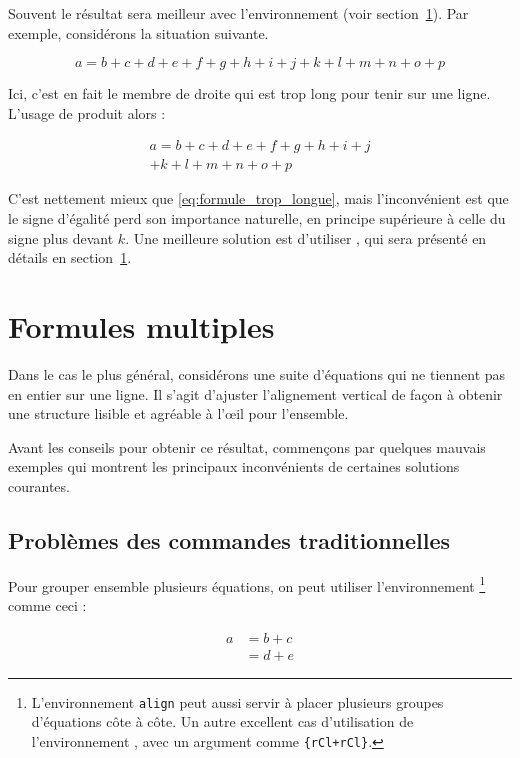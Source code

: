 Souvent le résultat sera
meilleur avec l'environnement  (voir
section~\ref{sec:IEEEeqnarray}). Par exemple, considérons la situation
suivante.
\begin{example}
\begin{equation}
  a = b + c + d + e + f 
  + g + h + i + j 
  + k + l + m + n + o + p  
  \label{eq:formule_trop_longue}
\end{equation}
\end{example}
\noindent
Ici, c'est en fait le membre de droite qui est trop long pour tenir sur une
ligne. L'usage de  produit alors :
\begin{example}
\begin{multline}
  a = b + c + d + e + f 
  + g + h + i + j \\
  + k + l + m + n + o + p
\end{multline}
\end{example}

C'est nettement mieux que \eqref{eq:formule_trop_longue}, mais
l'inconvénient est que le signe d'égalité perd son importance naturelle, en
principe supérieure à celle du signe \og plus \fg devant $k$. Une meilleure
solution est d'utiliser , qui sera présenté en détails en
section~\ref{sec:IEEEeqnarray}.


\section{Formules multiples}
\label{sec:IEEEeqnarray}

Dans le cas le plus général, considérons une suite d'équations qui ne tiennent
pas en entier sur une ligne. Il s'agit d'ajuster l'alignement vertical de
façon à obtenir une structure lisible et agréable à l'\oe il pour l'ensemble.

Avant les conseils pour obtenir ce résultat, commençons par quelques mauvais
exemples qui montrent les principaux inconvénients de certaines solutions
courantes.

\subsection{Problèmes des commandes traditionnelles}
\label{sec:problems_traditional}

Pour grouper ensemble plusieurs équations, on peut utiliser
l'environnement \footnote{L'environnement \texttt{align} peut aussi
  servir à placer plusieurs groupes d'équations côte à côte. Un autre excellent
  cas d'utilisation de l'environnement , avec un
  argument comme
  \texttt{\{rCl+rCl\}}.} comme ceci :
\begin{example}
 \begin{align}
  a & = b + c \\
  & = d + e
 \end{align}
\end{example}

